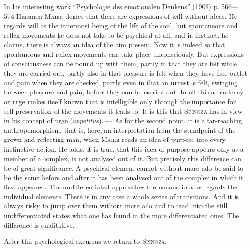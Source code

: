\documentclass[12pt]{article}
\newcommand{\opage}[1]{\marginnote{\footnotesize\textit{[#1]}}}
\begin{document}
\opage{63}In his interesting work ``Psychologie des emotionalen Denkens'' (1908) p.
566---574 \textsc{Heinrich Maier} denies that there are expressions of will without ideas. He
regards will as the innermost being of the life of the soul, but spontaneous and reflex movements
he does not take to be psychical at all, and in instinct, he claims, there is always an idea of
the aim present. %
Now it is indeed so that spontaneous and reflex movements can take place unconsciously. But
expressions of consciousness can be bound up with them, partly in that they are felt while they
are carried out, partly also in that pleasure is felt when they have free outlet and pain when
they are checked, partly even in that an unrest is felt, swinging between pleasure and pain,
before they can be carried out. In all this a tendency or urge makes itself known that is
intelligible only through the importance for self-preservation of the movements it leads to. It
is this that \textsc{Spinoza} has in view in his concept of urge (\textit{appetitus}). --- As for
the second point, it is a far-reaching anthropomorphism, that is, here, an interpretation from
the standpoint of the grown and reflecting man, when \textsc{Maier} reads an idea of purpose into
every instinctive action. He adds, it is true, that this idea of purpose appears only as a member
of a complex, is not analysed out of it. But precisely this difference can be of great
significance. A psychical element cannot without more ado be said to be the same before and after
it has been analysed out of the complex in which it first appeared. The undifferentiated
approaches the unconscious as regards the individual elements. There is in any case a whole series
of transitions. And it is always risky to jump over them without more ado and to read into the
still undifferentiated states what one has found in the more differentiated ones. The difference
is qualitative.

After this psychological excursus we return to \textsc{Spinoza}.
\end{document}

